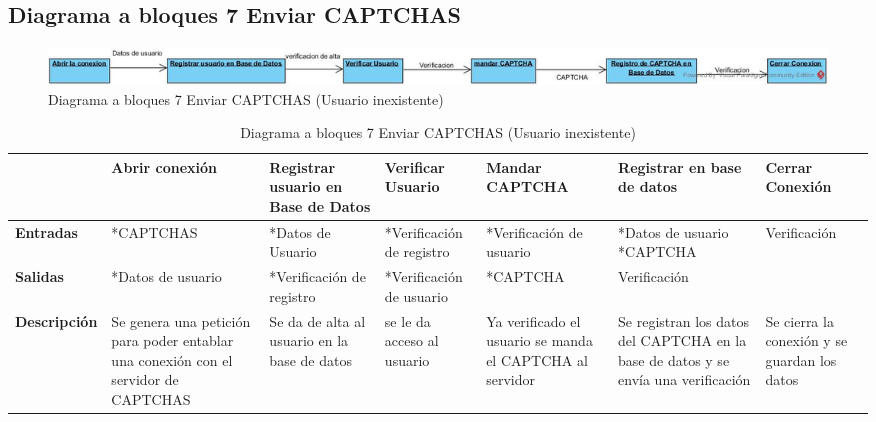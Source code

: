 \subsection{Diagrama a bloques 7 Enviar CAPTCHAS}
\begin{figure}[H]
	\includegraphics[width=1\linewidth, height=1cm]{./images/bloques7.jpg}
	\caption{Diagrama a bloques 7 Enviar CAPTCHAS (Usuario inexistente)}
	\label{fig:5-7-1}
\end{figure}
\begin{table}[H]
 \centering
   {
     \begin{tabular}{| p{2cm} | p{2cm} | p{} | p{2cm} | p{} | p{} | p{2cm} |}
     \hline
     & \textbf{Abrir conexión} & \textbf{Registrar usuario en Base de Datos} & \textbf{Verificar Usuario} & \textbf{Mandar CAPTCHA} & \textbf{Registrar en base de datos} & \textbf{Cerrar Conexión}\\
     \hline
     \textbf{Entradas} & *CAPTCHAS & *Datos de Usuario & *Verificación de registro & *Verificación de usuario & *Datos de usuario *CAPTCHA & Verificación\\
     \hline
     \textbf{Salidas} & *Datos de usuario & *Verificación de registro & *Verificación de usuario & *CAPTCHA & Verificación &\\
     \hline
     \textbf{Descripción} & Se genera una petición para poder entablar una conexión con el servidor de CAPTCHAS & Se da de alta al usuario en la base de datos & se le da acceso  al usuario & Ya verificado el usuario se manda el CAPTCHA al servidor & Se registran los datos del CAPTCHA en la base de datos y se envía una verificación & Se cierra la conexión y se guardan los datos\\
	\hline
    \end{tabular}
    }
    \caption{Diagrama a bloques 7 Enviar CAPTCHAS (Usuario inexistente)}
    \label{tabla:b7}
\end{table}
\pagebreak
